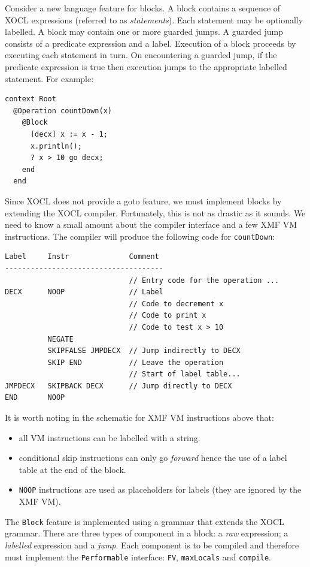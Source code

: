 \documentclass{article}
\begin{document}
Consider a new language feature for blocks. A block contains a sequence of XOCL
expressions (referred to as {\em statements}). Each statement may be optionally 
labelled. A block may contain one or more guarded jumps. A guarded jump consists 
of a predicate expression and a label. Execution of a block proceeds by executing 
each statement in turn. On encountering a guarded jump, if the predicate expression is
true then execution jumps to the appropriate labelled statement. For example:
\begin{verbatim}
context Root
  @Operation countDown(x)  
    @Block
      [decx] x := x - 1;
      x.println();
      ? x > 10 go decx;
    end
  end
\end{verbatim}
Since XOCL does not provide a goto feature, we must implement blocks by extending the
XOCL compiler. Fortunately, this is not as drastic as it sounds. We need to know a
small amount about the compiler interface and a few XMF VM instructions. The compiler
will produce the following code for {\tt countDown}:
\begin{verbatim}
Label     Instr              Comment
-------------------------------------
                             // Entry code for the operation ...
DECX      NOOP               // Label
                             // Code to decrement x
                             // Code to print x
                             // Code to test x > 10
          NEGATE
          SKIPFALSE JMPDECX  // Jump indirectly to DECX
          SKIP END           // Leave the operation
                             // Start of label table...
JMPDECX   SKIPBACK DECX      // Jump directly to DECX
END       NOOP
\end{verbatim}
It is worth noting in the schematic for XMF VM instructions above that:
\begin{itemize}
\item all VM instructions can be labelled with a string.
\item conditional skip instructions can only go {\em forward} hence the use of a label table
at the end of the block.
\item {\tt NOOP} instructions are used as placeholders for labels (they are ignored by the 
XMF VM).
\end{itemize}
The {\tt Block} feature is implemented using a grammar that extends the XOCL grammar.
There are three types of component in a block: a {\em raw} expression; a {\em labelled}
expression and a {\em jump}. Each component is to be compiled and therefore must implement
the {\tt Performable} interface: {\tt FV}, {\tt maxLocals} and {\tt compile}. 
\end{document}
